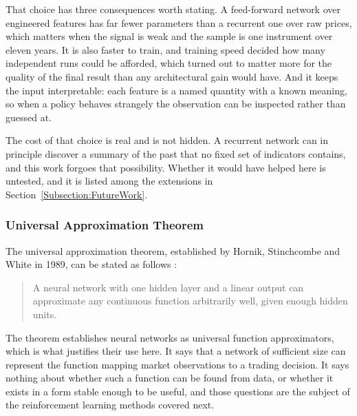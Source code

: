 That choice has three consequences worth stating. A feed-forward network over engineered features has far fewer parameters than a recurrent one over raw prices, which matters when the signal is weak and the sample is one instrument over eleven years. It is also faster to train, and training speed decided how many independent runs could be afforded, which turned out to matter more for the quality of the final result than any architectural gain would have. And it keeps the input interpretable: each feature is a named quantity with a known meaning, so when a policy behaves strangely the observation can be inspected rather than guessed at.

The cost of that choice is real and is not hidden. A recurrent network can in principle discover a summary of the past that no fixed set of indicators contains, and this work forgoes that possibility. Whether it would have helped here is untested, and it is listed among the extensions in Section~\ref{Subsection:FutureWork}.

\subsubsection{Universal Approximation Theorem}

The universal approximation theorem, established by Hornik, Stinchcombe and White in 1989, can be stated as follows \cite{hornik_multilayer_1989}:

\begin{quote}
A neural network with one hidden layer and a linear output can approximate any continuous function arbitrarily well, given enough hidden units.
\end{quote}

The theorem establishes neural networks as universal function approximators, which is what justifies their use here. It says that a network of sufficient size can represent the function mapping market observations to a trading decision. It says nothing about whether such a function can be found from data, or whether it exists in a form stable enough to be useful, and those questions are the subject of the reinforcement learning methods covered next.